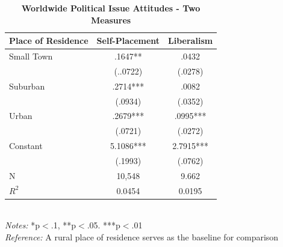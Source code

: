 \documentclass[12pt, titlepage]{article}
\newcommand\e{\emph}
\newcommand\tb{\textbf}
\begin{document}
\begin{appendices}
\begin{singlespace}
	\begin{table}[H]
		\centering
		\caption{\tb{Worldwide Political Issue Attitudes - Two Measures}}
		\begin{tabulary}{\linewidth}{l c c}
			\\
			\hline
			\tb{Place of Residence}&\tb{Self-Placement}&\tb{Liberalism} \\
			\hline
			Small Town&.1647**&.0432  \\    
			& (..0722) &(.0278)  \\
			Suburban & .2714*** &.0082\\ 
			& (.0934) &(.0352) \\
			Urban   & .2679*** &.0995***  \\
			& (.0721)  &(.0272)  \\
			Constant   & 5.1086*** &2.7915*** \\
			&(.1993)&(.0762)  \\
			N  & 10,548 &9.662  \\
			$R^2$	& 0.0454&0.0195 \\
			\hline                                       
		\end{tabulary}
		\\
		\e{Notes:} *p$<$.1, **p$<$.05. ***p$<$.01 \\
		\e{Reference:} A rural place of residence serves as the baseline for comparison
		\label{table102}
	\end{table}
\end{singlespace}


\clearpage

\end{appendices}


\clearpage


\end{document}
